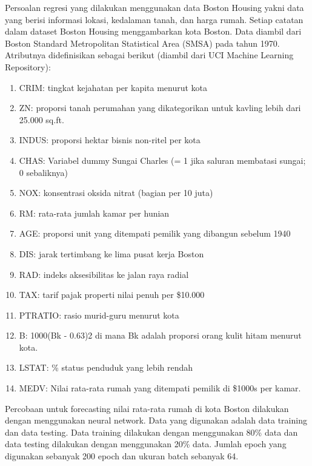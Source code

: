 \documentclass[a4, 12px]{article}
\theoremstyle{definition}
\theoremstyle{remark}
\begin{document}
Persoalan regresi yang dilakukan menggunakan data Boston Housing yakni data yang berisi informasi lokasi, kedalaman tanah, dan harga rumah. Setiap catatan dalam dataset Boston Housing menggambarkan kota Boston. Data diambil dari Boston Standard Metropolitan Statistical Area (SMSA) pada tahun 1970. Atributnya didefinisikan sebagai berikut (diambil dari UCI Machine Learning Repository): 
\begin{enumerate}[noitemsep]
	\item CRIM: tingkat kejahatan per kapita menurut kota
	\item ZN: proporsi tanah perumahan yang dikategorikan untuk kavling lebih dari 25.000 sq.ft.
	\item INDUS: proporsi hektar bisnis non-ritel per kota
	\item CHAS: Variabel dummy Sungai Charles (= 1 jika saluran membatasi sungai; 0 sebaliknya)
	\item NOX: konsentrasi oksida nitrat (bagian per 10 juta)
	\item RM: rata-rata jumlah kamar per hunian
	\item AGE: proporsi unit yang ditempati pemilik yang dibangun sebelum 1940
	\item DIS: jarak tertimbang ke lima pusat kerja Boston
	\item RAD: indeks aksesibilitas ke jalan raya radial
	\item TAX: tarif pajak properti nilai penuh per \$10.000
	\item PTRATIO: rasio murid-guru menurut kota
	\item B: 1000(Bk - 0.63)2 di mana Bk adalah proporsi orang kulit hitam menurut kota.
	\item LSTAT: \% status penduduk yang lebih rendah
	\item MEDV: Nilai rata-rata rumah yang ditempati pemilik di \$1000s per kamar.
\end{enumerate}

Percobaan untuk forecasting nilai rata-rata rumah di kota Boston dilakukan dengan menggunakan neural network. Data yang digunakan adalah data training dan data testing. Data training dilakukan dengan menggunakan 80\% data dan data testing dilakukan dengan menggunakan 20\% data. Jumlah epoch yang digunakan sebanyak 200 epoch dan ukuran batch sebanyak 64.
\end{document}
